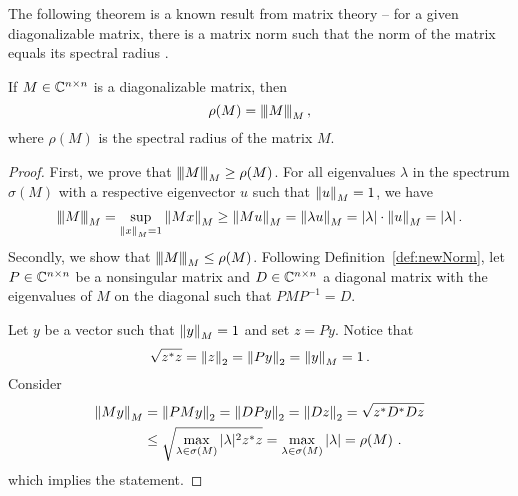 The following theorem is a known result from matrix theory -- for a given diagonalizable matrix, there is a matrix norm such that the norm of the matrix equals its spectral radius \cite{horn}.

\begin{thm}
\label{thm:norm}
If $M\in\CC^{n\times n}$ is a diagonalizable matrix, then %
$$
\rho(M)=\Mnorm{M}{M}\,,
$$
where $\rho(M)$ is the spectral radius of the matrix $M$. %
\end{thm}
\begin{proof}
First, we prove that $\Mnorm{M}{M}\geq\rho(M)$. For all eigenvalues $\lambda$ in the spectrum $\sigma(M)$ with a respective eigenvector $u$ such that $\norm{u}{M}=1$, we have
$$
\Mnorm{M}{M}=\sup_{\norm{x}{M}=1} \norm{Mx}{M}\geq \norm{Mu}{M}=\norm{\lambda u}{M}=|\lambda|\cdot\norm{u}{M}=|\lambda|\,.
$$
Secondly, we show that $\Mnorm{M}{M}\leq\rho(M)$. Following Definition~\ref{def:newNorm}, let $P\in\CC^{n\times n}$ be a  nonsingular matrix  and $D\in\CC^{n\times n}$ a diagonal matrix  with the eigenvalues of $M$ on the diagonal such that $PMP^{-1}=D$.

Let $y$ be a  vector such that $\norm{y}{M}=1$ and set $z=Py$. Notice that 
$$
\sqrt{z^*z}=\norm{z}{2}=\norm{Py}{2}=\norm{y}{M}=1\,.
$$
Consider
\begin{align*}
\norm{My}{M}&=\norm{PMy}{2}=\norm{DPy}{2}=\norm{Dz}{2}=\sqrt{z^*D^*Dz}\\
    &\leq \sqrt{\max_{\lambda\in\sigma(M)}|\lambda|^2 z^*z}=\max_{\lambda\in\sigma(M)}|\lambda|=\rho(M)\,\,.
\end{align*}
which implies the statement.
\end{proof}


